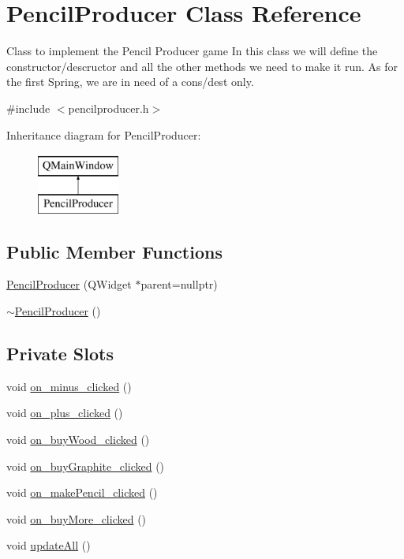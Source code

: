 \hypertarget{classPencilProducer}{}\section{Pencil\+Producer Class Reference}
\label{classPencilProducer}


Class to implement the Pencil Producer game  In this class we will define the constructor/descructor and all the other methods we need to make it run. As for the first Spring, we are in need of a cons/dest only.  




{\ttfamily \#include $<$pencilproducer.\+h$>$}

Inheritance diagram for Pencil\+Producer\+:\begin{figure}[H]
\begin{center}
\leavevmode
\includegraphics[height=2.000000cm]{classPencilProducer}
\end{center}
\end{figure}
\subsection*{Public Member Functions}
\begin{DoxyCompactItemize}
\item 
\hyperlink{classPencilProducer_a7b5425cd4bfd41d7b9cc9fe04101df06}{Pencil\+Producer} (Q\+Widget $\ast$parent=nullptr)
\item 
\hyperlink{classPencilProducer_a6e4548750600eb7b6886538a23ba4808}{$\sim$\+Pencil\+Producer} ()
\end{DoxyCompactItemize}
\subsection*{Private Slots}
\begin{DoxyCompactItemize}
\item 
void \hyperlink{classPencilProducer_a4463cb3676d728734fb935c8ea6fcb14}{on\+\_\+minus\+\_\+clicked} ()
\item 
void \hyperlink{classPencilProducer_a4f25cb44f7656627fb2118db163c6294}{on\+\_\+plus\+\_\+clicked} ()
\item 
void \hyperlink{classPencilProducer_a349d36fe7bfb716010b7ee0172e2ba88}{on\+\_\+buy\+Wood\+\_\+clicked} ()
\item 
void \hyperlink{classPencilProducer_aa6d6a98ad6b815634efbbf263605824e}{on\+\_\+buy\+Graphite\+\_\+clicked} ()
\item 
void \hyperlink{classPencilProducer_a9a278b633e203bc16941093ca1727c85}{on\+\_\+make\+Pencil\+\_\+clicked} ()
\item 
void \hyperlink{classPencilProducer_a2d54ee1f50fa095221bde3adf0d71d95}{on\+\_\+buy\+More\+\_\+clicked} ()
\item 
void \hyperlink{classPencilProducer_af182bfe6656f6e068da6feb74afa0bec}{update\+All} ()
\end{DoxyCompactItemize}
